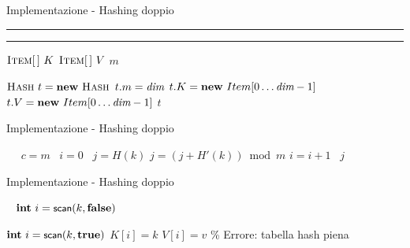 \begin{frame}{Implementazione - Hashing doppio}


\vspace{-12pt}
\begin{Procedure}
\noindent\rule{\textwidth}{0.8pt}\hrulefill

\vspace{-3pt}
{\Hash}

\vspace{-9pt}
\noindent\rule{\textwidth}{0.8pt}\hrulefill

$\textsc{Item}[\,]\ K$
$\textsc{Item}[\,]\ V$
\INTEGER $m$
\BlankLine

\PROCEDURE{\Hash \hashconstructor(\INTEGER $\hashsize$)}
{
  $\Hash\ t = \NEW\ \Hash$\;
  $t.m = \textit{dim}$\;
  $t.K = \NEW\ Item[0 \mldots \hashsize-1]$\;
  $t.V = \NEW\ Item[0 \mldots \hashsize-1]$\;
  \Return $t$\;
}
\BlankLine

\end{Procedure}
\end{frame}
 
\begin{frame}{Implementazione - Hashing doppio}
\vspace{-12pt}
\begin{Procedure}
\INTEGER\ 
{
  \INTEGER\ $c = m$
  \INTEGER\ $i = 0$
  \INTEGER\ $j = H(k)$
  {
    $j = (j + H'(k)) \bmod m$\;
    $i = i+1$\; 
  }
  \Return\ $j$\;
}
\BlankLine

\end{Procedure}
\end{frame}
 
\begin{frame}{Implementazione - Hashing doppio}
\vspace{-12pt}
\begin{Procedure}

\Item\ 
{
  $\INTEGER\ i = \hashscan(k, \FALSE)$\;
}
\BlankLine

{
  $\INTEGER\ i = \hashscan(k, \TRUE)$\;
  {
    $K[i] = k$\;
    $V[i] = v$\;
  }
  {
    \% Errore: tabella hash piena
  }
}
\end{Procedure}
\end{frame}
 
